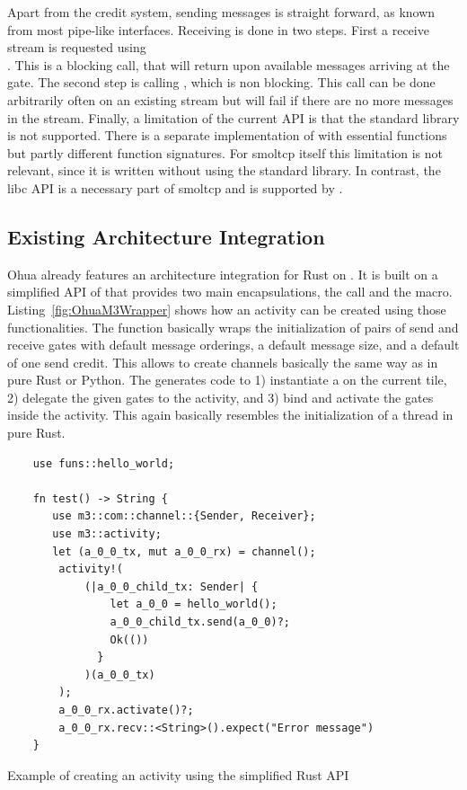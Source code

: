 Apart from the credit system, sending messages is straight forward, as known from most pipe-like interfaces. Receiving is done in two steps. First a receive stream is requested using \\
. This is a blocking call, that will return upon available messages arriving at the gate. The second step is calling , which is non blocking. This call can be done arbitrarily often on an existing stream but will fail if there are no more messages in the stream. Finally, a limitation of the current \md API is that the standard library is not supported. There is a separate implementation of  with essential functions but partly different function signatures. For smoltcp itself this limitation is not relevant, since it is written without using the standard library. In contrast, the libc API is a necessary part of smoltcp and is supported by \md. 

\subsection{Existing \md Architecture Integration}
Ohua already features an architecture integration for Rust on \md. It is built on a simplified API of \md that provides two main encapsulations, the  call and the  macro. Listing~\ref{fig:OhuaM3Wrapper} shows how an activity can be created using those functionalities. The function  basically wraps the initialization of pairs of send and receive gates with default message orderings, a default message size, and a default of one send credit. This allows to create channels basically the same way as in pure Rust or Python. The  generates code to 1) instantiate a  on the current tile, 2) delegate the given gates to the activity, and 3) bind and activate the gates inside the activity. This again basically resembles the initialization of a thread in pure Rust. 


\begin{codefigure}[ht]
    \centering
    \begin{verbatim}
    use funs::hello_world;
    
    fn test() -> String {
       use m3::com::channel::{Sender, Receiver};
       use m3::activity;
       let (a_0_0_tx, mut a_0_0_rx) = channel(); 
        activity!(
            (|a_0_0_child_tx: Sender| {    
                let a_0_0 = hello_world();
                a_0_0_child_tx.send(a_0_0)?;
                Ok(())
              }
            )(a_0_0_tx)
        );
        a_0_0_rx.activate()?;
        a_0_0_rx.recv::<String>().expect("Error message")
    }

    \end{verbatim}
    \caption{Example of creating an activity using the simplified \md Rust API}
    \label{fig:OhuaM3Wrapper}
\end{codefigure}

